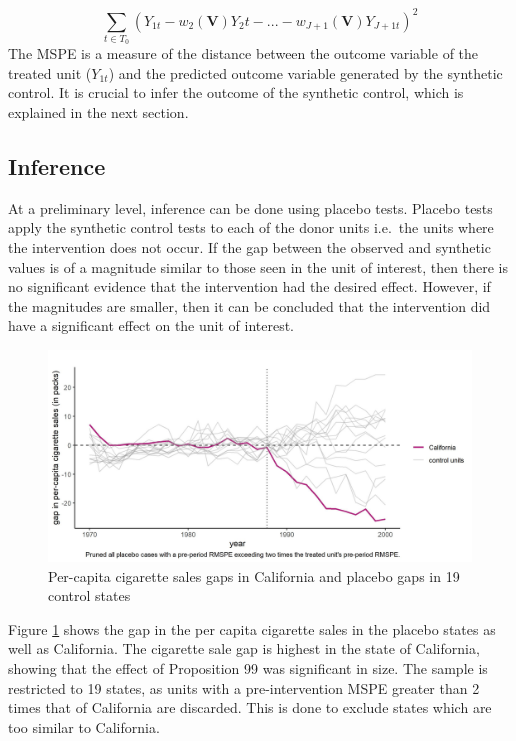\documentclass[12pt,nobind, a4paper]{reedthesis}
\begin{document}
 \[ \sum_{t \in T_0}(Y_{1t}- w_{2}(\mathbf{V})Y_2{t}-...-w_{J+1}(\mathbf{V})Y_{J+1t})^2\]
 The MSPE is a measure of the distance between the outcome variable of the treated unit (\(Y_{1t}\)) and the predicted outcome variable generated by the synthetic control. It is crucial to infer the outcome of the synthetic control, which is explained in the next section.

 \hypertarget{inference}{%
 \subsection{Inference}\label{inference}}

 At a preliminary level, inference can be done using placebo tests. Placebo tests apply the synthetic control tests to each of the donor units i.e.~the units where the intervention does not occur. If the gap between the observed and synthetic values is of a magnitude similar to those seen in the unit of interest, then there is no significant evidence that the intervention had the desired effect. However, if the magnitudes are smaller, then it can be concluded that the intervention did have a significant effect on the unit of interest.
 \begin{figure}

 {\centering \includegraphics[width=1\linewidth]{figure/calplacebo} 

 }

 \caption{Per-capita cigarette sales gaps in California and placebo gaps in 19 control states}\label{fig:placebo}
 \end{figure}
 Figure \ref{fig:placebo} shows the gap in the per capita cigarette sales in the placebo states as well as California. The cigarette sale gap is highest in the state of California, showing that the effect of Proposition 99 was significant in size. The sample is restricted to 19 states, as units with a pre-intervention MSPE greater than 2 times that of California are discarded. This is done to exclude states which are too similar to California.
 \linebreak
\end{document}
